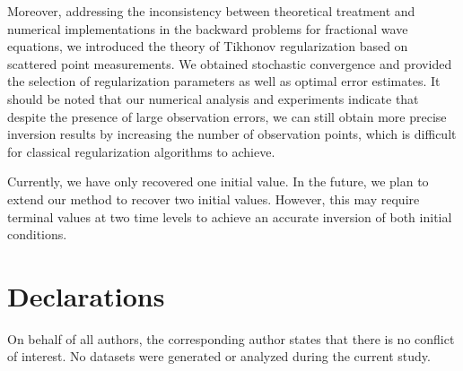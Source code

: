 \documentclass[11pt]{article}
\numberwithin{equation}{section}
\begin{document}
Moreover, addressing the inconsistency between theoretical treatment and numerical implementations in the backward problems for fractional wave equations, we introduced the theory of Tikhonov regularization based on scattered point measurements. We obtained stochastic convergence and provided the selection of regularization parameters as well as optimal error estimates. It should be noted that our numerical analysis and experiments indicate that despite the presence of large observation errors, we can still obtain more precise inversion results by increasing the number of observation points, which is difficult for classical regularization algorithms to achieve. %

Currently, we have only recovered one initial value. In the future, we plan to extend our method to recover two initial values. However, this may require terminal values at two time levels to achieve an accurate inversion of both initial conditions.



\section*{Declarations}
On behalf of all authors, the corresponding author states that there is no conflict of interest. No datasets were generated or analyzed during the current study.


\end{document}

